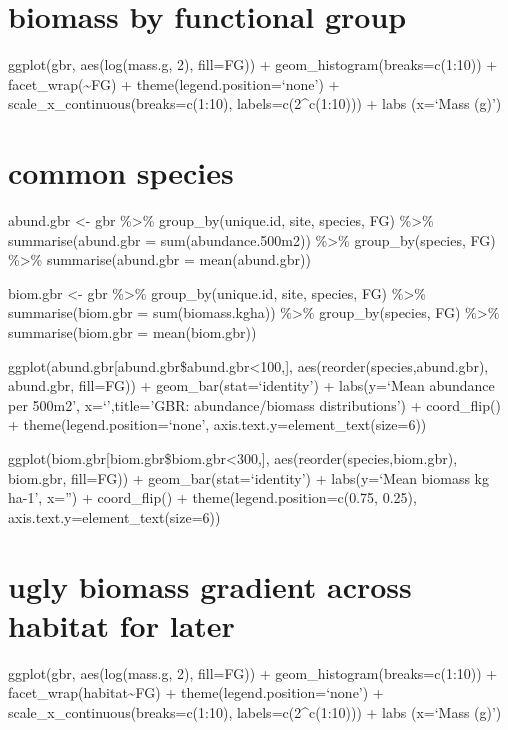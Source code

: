 \documentclass[]{article}
\begin{document}
\section{biomass by functional group}\label{biomass-by-functional-group}

ggplot(gbr, aes(log(mass.g, 2), fill=FG)) +
geom\_histogram(breaks=c(1:10)) + facet\_wrap(\textasciitilde{}FG) +
theme(legend.position=`none') + scale\_x\_continuous(breaks=c(1:10),
labels=c(2\^{}c(1:10))) + labs (x=`Mass (g)')

\section{common species}\label{common-species}

abund.gbr \textless{}- gbr \%\textgreater{}\% group\_by(unique.id, site,
species, FG) \%\textgreater{}\% summarise(abund.gbr =
sum(abundance.500m2)) \%\textgreater{}\% group\_by(species, FG)
\%\textgreater{}\% summarise(abund.gbr = mean(abund.gbr))

biom.gbr \textless{}- gbr \%\textgreater{}\% group\_by(unique.id, site,
species, FG) \%\textgreater{}\% summarise(biom.gbr = sum(biomass.kgha))
\%\textgreater{}\% group\_by(species, FG) \%\textgreater{}\%
summarise(biom.gbr = mean(biom.gbr))

ggplot(abund.gbr{[}abund.gbr\$abund.gbr\textless{}100,{]},
aes(reorder(species,abund.gbr), abund.gbr, fill=FG)) +
geom\_bar(stat=`identity') + labs(y=`Mean abundance per 500m2',
x=`',title='GBR: abundance/biomass distributions') + coord\_flip() +
theme(legend.position=`none', axis.text.y=element\_text(size=6))

ggplot(biom.gbr{[}biom.gbr\$biom.gbr\textless{}300,{]},
aes(reorder(species,biom.gbr), biom.gbr, fill=FG)) +
geom\_bar(stat=`identity') + labs(y=`Mean biomass kg ha-1', x='') +
coord\_flip() + theme(legend.position=c(0.75, 0.25),
axis.text.y=element\_text(size=6))

\section{ugly biomass gradient across habitat for
later}\label{ugly-biomass-gradient-across-habitat-for-later}

ggplot(gbr, aes(log(mass.g, 2), fill=FG)) +
geom\_histogram(breaks=c(1:10)) +
facet\_wrap(habitat\textasciitilde{}FG) + theme(legend.position=`none')
+ scale\_x\_continuous(breaks=c(1:10), labels=c(2\^{}c(1:10))) + labs
(x=`Mass (g)')
\end{document}
